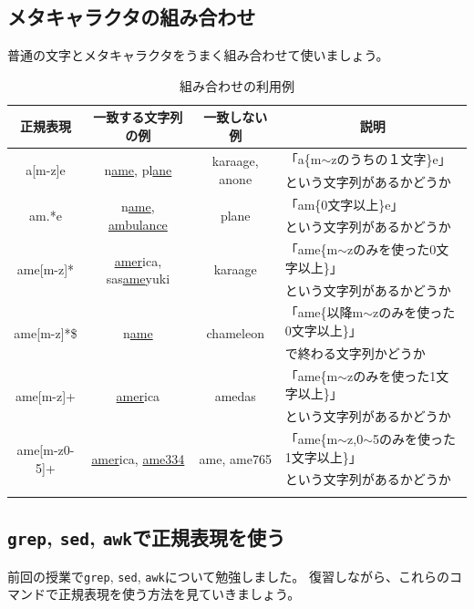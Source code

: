\documentclass[a4j]{ltjsreport}
\newcommand{\cn}[1]{\multirow{2}{*}{#1}}
\begin{document}
    \newpage
    \subsection{メタキャラクタの組み合わせ}
    普通の文字とメタキャラクタをうまく組み合わせて使いましょう。

    \begin{longtable}[c]{|c|c|c|l|}
        \hline
        \multicolumn{1}{|c|}{\textbf{正規表現}}&\multicolumn{1}{|c|}{\textbf{一致する文字列の例}}&\multicolumn{1}{|c|}{\textbf{一致しない例}}&\multicolumn{1}{|c|}{\textbf{説明}}\\
        \hline\hline
        \cn{a[m-z]e} & \cn{n\underline{ame}, pl\underline{ane}}& \cn{karaage, anone} &「a\{m$\sim$zのうちの１文字\}e」\\
        &&&という文字列があるかどうか\\
        \hline
        \cn{am.*e} & \cn{n\underline{ame}, \underline{ambulance}} &  \cn{plane} & 「am\{0文字以上\}e」\\
        &&&という文字列があるかどうか\\
        \hline
        \cn{ame[m-z]*} & \cn{\underline{amer}ica, sas\underline{ame}yuki} & \cn{karaage} & 「ame\{m$\sim$zのみを使った0文字以上\}」\\
        &&&という文字列があるかどうか\\
        \hline
        \cn{ame[m-z]*\$} & \cn{n\underline{ame}} & \cn{chameleon} &「ame\{以降m$\sim$zのみを使った0文字以上\}」\\
        &&&で終わる文字列かどうか\\
        \hline
        \cn{ame[m-z]+}& \cn{\underline{amer}ica} & \cn{amedas} &「ame\{m$\sim$zのみを使った1文字以上\}」\\
        &&&という文字列があるかどうか\\
        \hline
        \cn{ame[m-z0-5]+} & \cn{\underline{amer}ica, \underline{ame334}} & \cn{ame, ame765} &「ame\{m$\sim$z,0$\sim$5のみを使った1文字以上\}」\\
        &&&という文字列があるかどうか\\
        \hline
        \caption{組み合わせの利用例}
    \end{longtable}

    \newpage
    \subsection{\texttt{grep}, \texttt{sed}, \texttt{awk}で正規表現を使う}
    前回の授業で\texttt{grep}, \texttt{sed}, \texttt{awk}について勉強しました。
    復習しながら、これらのコマンドで正規表現を使う方法を見ていきましょう。
\end{document}
